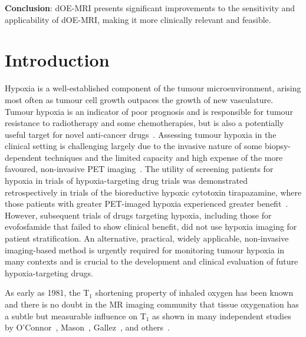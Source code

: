 \noindent\textbf{Conclusion}: dOE-MRI presents significant improvements to the sensitivity and applicability of dOE-MRI, making it more clinically relevant and feasible.

\section{Introduction}

Hypoxia is a well-established component of the tumour microenvironment, arising most often as tumour cell growth outpaces the growth of new vasculature.
Tumour hypoxia is an indicator of poor prognosis and is responsible for tumour resistance to radiotherapy and some chemotherapies, but is also a potentially useful target for novel anti-cancer drugs~\cite{Wilson:2011jp}.
Assessing tumour hypoxia in the clinical setting is challenging largely due to the invasive nature of some biopsy-dependent techniques and the limited capacity and high expense of the more favoured, non-invasive PET imaging~\cite{Horsman:2012kw}.
The utility of screening patients for hypoxia in trials of hypoxia-targeting drug trials was demonstrated retrospectively in trials of the bioreductive hypoxic cytotoxin tirapazamine, where those patients with greater PET-imaged hypoxia experienced greater benefit~\cite{Rischin:2006fz}.
However, subsequent trials of drugs targeting hypoxia, including those for evofosfamide that failed to show clinical benefit, did not use hypoxia imaging for patient stratification.
An alternative, practical, widely applicable, non-invasive imaging-based method is urgently required for monitoring tumour hypoxia in many contexts and is crucial to the development and clinical evaluation of future hypoxia-targeting drugs.

As early as 1981, the T$_1$ shortening property of inhaled oxygen has been known~\cite{Young:1981vf,Thulborn:1982tb} and there is no doubt in the MR imaging community that tissue oxygenation has a subtle but measurable influence on T$_1$ as shown in many independent studies by O'Connor~\cite{OConnor:2016ee,OConnor:2009ku,OConnor:2009bp}, Mason~\cite{Zhao:2015ez,White:2016fz,Hallac:2014cb}, Gallez~\cite{Jordan:2012do}, and others~\cite{Tadamura:1997vc,McGrath:2008kx,Kershaw:2010ha,Linnik:2013hf}.


